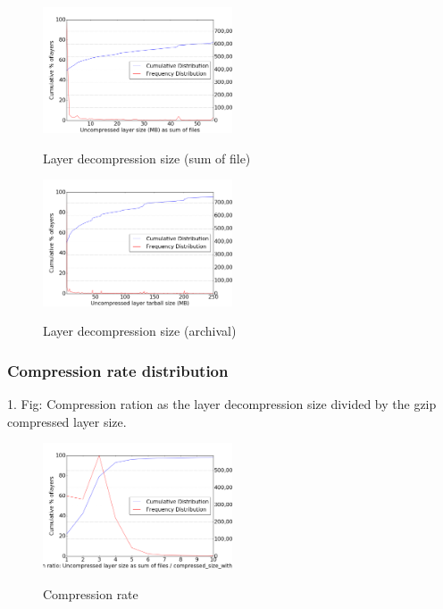 \begin{figure}
	\centering
	\includegraphics[width=0.5\textwidth]{graphs/Uncompressed_layer_size_(MB)_as_sum_of_files.png}\\
	\caption{Layer decompression size (sum of file)}\label{fig_image_size_compression}
\end{figure}

\begin{figure}
	\centering
	\includegraphics[width=0.5\textwidth]{graphs/Uncompressed_layer_tarball_size_(MB).png}\\
	\caption{Layer decompression size (archival)}\label{fig_image_size_compression}
\end{figure}

\subsubsection{Compression rate distribution}

1. Fig: Compression ration as the layer decompression size divided by the gzip compressed layer size.

\begin{figure}
	\centering
	\includegraphics[width=0.5\textwidth]{graphs/Compression_ratio_Uncompressed_layer_size_as_sum_of_files_divided_by_compressed_size_with_method_gzip.png}\\
	\caption{Compression rate}\label{fig_image_size_compression}
\end{figure}

